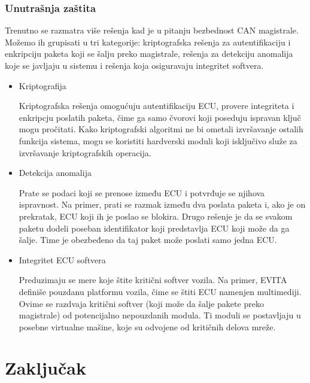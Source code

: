 \documentclass[a4paper]{article}
\begin{document}
\subsubsection{Unutrašnja zaštita}
\label{subsubsec: unutkom}

Trenutno se razmatra više rešenja kad je u pitanju bezbednost CAN magistrale. Možemo ih grupisati u tri kategorije: kriptografska rešenja za autentifikaciju i enkripciju paketa koji se šalju preko magistrale, rešenja za detekciju anomalija koje se javljaju u sistemu i rešenja koja osiguravaju integritet softvera.

\begin{itemize}

	\item Kriptografija

    Kriptografska rešenja omogućuju autentifikaciju ECU, provere integriteta i enkripcju poslatih paketa, čime ga samo čvorovi koji poseduju ispravan ključ mogu pročitati. Kako kriptografski algoritmi ne bi ometali izvršavanje ostalih funkcija sistema, mogu se koristiti hardverski moduli koji isključivo služe za izvršavanje kriptografskih operacija. 

	\item Detekcija anomalija

	Prate se podaci koji se prenose između ECU i potvrđuje se njihova ispravnost. Na primer, prati se razmak između dva poslata paketa i, ako je on prekratak, ECU koji ih je poslao se blokira. Drugo rešenje je da se svakom paketu dodeli poseban identifikator koji predstavlja ECU koji može da ga šalje. Time je obezbeđeno da taj paket može poslati samo jedna ECU. 

	\item Integritet ECU softvera
    
    Preduzimaju se mere koje štite kritični softver vozila. Na primer, EVITA definiše pouzdanu platformu vozila, čime se štiti ECU namenjen multimediji. Ovime se razdvaja kritični softver (koji može da šalje pakete preko magistrale) od potencijalno nepouzdanih modula. Ti moduli se postavljaju u posebne virtualne mašine, koje su odvojene od kritičnih delova mreže. 
\end{itemize}

\section{Zaključak}
\label{sec:kraj}
\end{document}
